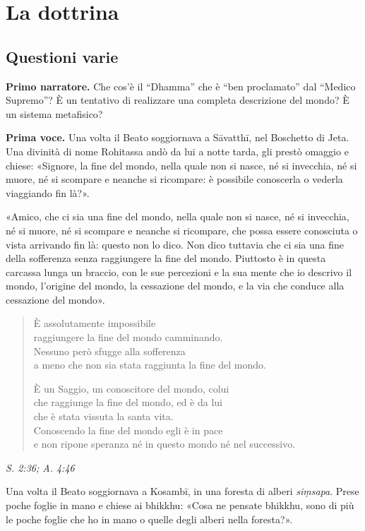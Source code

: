 \chapter{La dottrina}

\hypertarget{x-questioni-varie}{\section*{Questioni varie}}
\textbf{Primo narratore.} Che cos’è il “Dhamma” che è “ben proclamato” dal
“Medico Supremo”? È un tentativo di realizzare una completa descrizione
del mondo? È un sistema metafisico?


\textbf{Prima voce.} Una volta il Beato soggiornava a Sāvatthī, nel Boschetto di
Jeta. Una divinità di nome Rohitassa andò da lui a notte tarda, gli
prestò omaggio e chiese: «Signore, la fine del mondo, nella quale non si
nasce, né si invecchia, né si muore, né si scompare e neanche si
ricompare: è possibile conoscerla o vederla viaggiando fin là?».


«Amico, che ci sia una fine del mondo, nella quale non si nasce, né si
invecchia, né si muore, né si scompare e neanche si ricompare, che possa
essere conosciuta o vista arrivando fin là: questo non lo dico. Non dico
tuttavia che ci sia una fine della sofferenza senza raggiungere la fine
del mondo. Piuttosto è in questa carcassa lunga un braccio, con le sue
percezioni e la sua mente che io descrivo il mondo, l’origine del mondo,
la cessazione del mondo, e la via che conduce alla cessazione del
mondo».


\begin{quotation}
È assolutamente impossibile \\
raggiungere la fine del mondo camminando. \\
Nessuno però sfugge alla sofferenza \\
a meno che non sia stata raggiunta la fine del mondo.


È un Saggio, un conoscitore del mondo, colui \\
che raggiunge la fine del mondo, ed è da lui \\
che è stata vissuta la santa vita. \\
Conoscendo la fine del mondo egli è in pace \\
e non ripone speranza né in questo mondo né nel successivo.
\end{quotation}

\emph{S. 2:36; A. 4:46}


Una volta il Beato soggiornava a Kosambī, in una foresta di alberi
\emph{siṃsapa}. Prese poche foglie in mano e chiese ai bhikkhu: «Cosa ne
pensate bhikkhu, sono di più le poche foglie che ho in mano o quelle
degli alberi nella foresta?».


